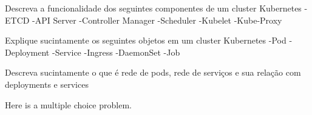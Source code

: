 \documentclass{ximera}
\begin{document}
\begin{example}
Descreva a funcionalidade dos seguintes componentes de um cluster Kubernetes
-ETCD
-API Server
-Controller Manager
-Scheduler
-Kubelet
-Kube-Proxy
\begin{explanation}
\end{explanation}
\end{example}


\begin{example}
Explique sucintamente os seguintes objetos em um cluster Kubernetes
-Pod
-Deployment
-Service
-Ingress
-DaemonSet
-Job
\begin{explanation}
\end{explanation}
\end{example}


\begin{example}
Descreva sucintamente o que é rede de pods, rede de serviços e sua relação com deployments e services
\begin{explanation}
\end{explanation}
\end{example}

\begin{problem}
Here is a multiple choice problem.
\begin{multipleChoice}
\end{multipleChoice}
\end{problem}

\begin{exercise}
\begin{selectAll}
\end{selectAll}
\end{exercise}
\end{document}
